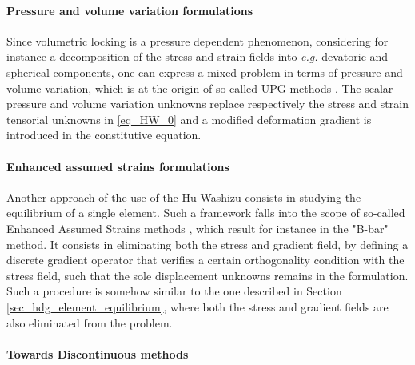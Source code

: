 \paragraph{Pressure and volume variation formulations}
\label{sec_pressure_swelling}

Since volumetric locking is a pressure dependent phenomenon,
considering for instance a decomposition of the stress and strain fields
into \textit{e.g.} devatoric and spherical components, one can express a
mixed problem in terms of pressure and volume variation, which is at the origin
of so-called UPG methods \cite{al_akhrass_integrating_2014,
  simo_quasi-incompressible_1991, simo_variational_1985}. The scalar
pressure and volume variation unknowns replace respectively the stress and
strain tensorial unknowns in \eqref{eq_HW_0} and a modified deformation
gradient is introduced in the constitutive equation.

\paragraph{Enhanced assumed strains formulations}
\label{sec_eas}

Another approach of the use of the Hu-Washizu consists in
studying the equilibrium of a single element. Such a framework falls
into the scope of so-called Enhanced Assumed Strains methods
\cite{simo_variational_1986, simo_class_1990}, which result for instance
in the "B-bar" method.
It consists in eliminating both the stress and gradient field, by defining a discrete gradient operator
that verifies a certain orthogonality condition with the stress field,
such that the sole displacement unknowns remains in the formulation.
Such a procedure is somehow similar to the one described in Section \ref{sec_hdg_element_equilibrium},
where both the stress and gradient fields are also eliminated from the problem.

\paragraph{Towards Discontinuous methods}

